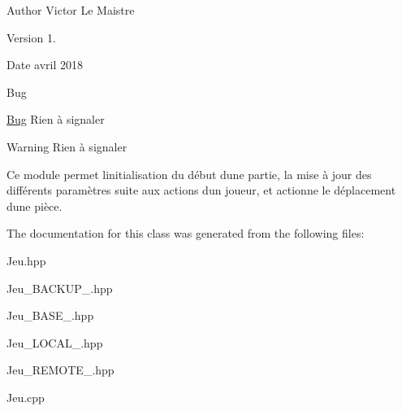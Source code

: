 \begin{DoxyAuthor}{Author}
Victor Le Maistre 
\end{DoxyAuthor}
\begin{DoxyVersion}{Version}
1. 
\end{DoxyVersion}
\begin{DoxyDate}{Date}
avril 2018 
\end{DoxyDate}
\begin{DoxyRefDesc}{Bug}
\item[\hyperlink{bug__bug000006}{Bug}]Rien à signaler \end{DoxyRefDesc}
\begin{DoxyWarning}{Warning}
Rien à signaler
\end{DoxyWarning}
Ce module permet l\textquotesingle{}initialisation du début d\textquotesingle{}une partie, la mise à jour des différents paramètres suite aux actions d\textquotesingle{}un joueur, et actionne le déplacement d\textquotesingle{}une pièce. 

The documentation for this class was generated from the following files\+:\begin{DoxyCompactItemize}
\item 
Jeu.\+hpp\item 
Jeu\+\_\+\+B\+A\+C\+K\+U\+P\+\_.\+hpp\item 
Jeu\+\_\+\+B\+A\+S\+E\+\_.\+hpp\item 
Jeu\+\_\+\+L\+O\+C\+A\+L\+\_.\+hpp\item 
Jeu\+\_\+\+R\+E\+M\+O\+T\+E\+\_.\+hpp\item 
Jeu.\+cpp\end{DoxyCompactItemize}
